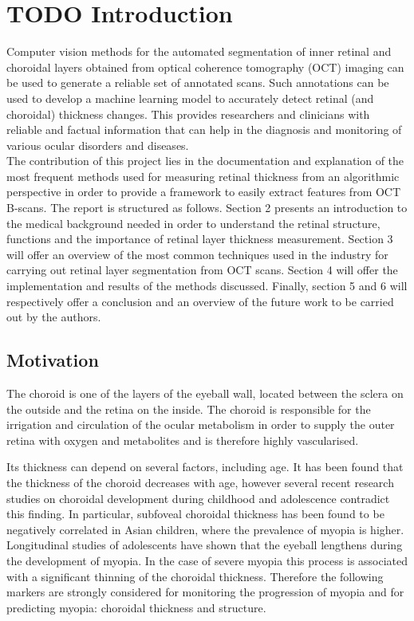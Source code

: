 \documentclass[12pt,a4paper]{scrartcl}
\begin{document}
\section{TODO Introduction}\label{s:introduction} 
Computer vision methods for the automated segmentation of inner retinal and choroidal layers obtained from optical coherence tomography (OCT) imaging \cite{Ronchetti2019statistic} can be used to generate a reliable set of annotated scans. Such annotations can be used to develop a machine learning model to accurately detect retinal (and choroidal) thickness changes.  This provides researchers and clinicians with reliable and factual information that can help in the diagnosis and monitoring of various ocular disorders and diseases. \\

The contribution of this project lies in the documentation and explanation of the most frequent methods used for measuring retinal thickness from an algorithmic perspective in order to provide a framework to easily extract features from OCT B-scans. The report is structured as follows. Section 2 presents an introduction to the medical background needed in order to understand the retinal structure, functions and the importance of retinal layer thickness measurement. Section 3 will offer an overview of the most common techniques used in the industry for carrying out retinal layer segmentation from OCT scans. Section 4 will offer the implementation and results of the methods discussed. Finally, section 5 and 6 will respectively offer a conclusion and an overview of the future work to be carried out by the authors. \\

\subsection{Motivation}
The choroid is one of the layers of the eyeball wall, located between the sclera on the outside and the retina on the inside. The choroid is responsible for the irrigation and circulation of the ocular metabolism in order to supply the outer retina with oxygen and metabolites and is therefore highly vascularised. \cite{WikiChoroid}

Its thickness can depend on several factors, including age. It has been found that the thickness of the choroid decreases with age, however several recent research studies on choroidal development during childhood and adolescence contradict this finding. In particular, subfoveal choroidal thickness has been found to be negatively correlated in Asian children, where the prevalence of myopia is higher. Longitudinal studies of adolescents have shown that the eyeball lengthens during the development of myopia. In the case of severe myopia this process is associated with a significant thinning of the choroidal thickness. Therefore the following markers are strongly considered for monitoring the progression of myopia and for predicting myopia: choroidal thickness and structure.\cite{ronchetti2019}
\end{document}
